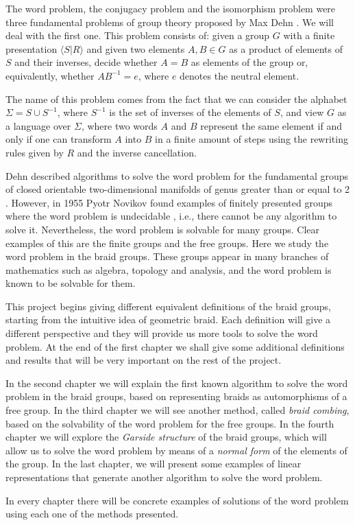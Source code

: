 \documentclass[TFG.tex]{subfiles}
\begin{document}

The word problem, the conjugacy problem and the isomorphism problem were three fundamental problems of group theory proposed by Max Dehn \cite{Dehn11}. We will deal with the first one. This problem consists of: given a group $G$ with a finite presentation $\langle S|R\rangle$ and given two elements $A,B\in G$ as a product of elements of $S$ and their inverses, decide whether $A=B$ as elements of the group or, equivalently, whether $AB^{-1}=e$, where $e$ denotes the neutral element. 

The name of this problem comes from the fact that we can consider the alphabet $\Sigma=S\cup S^{-1}$, where $S^{-1}$ is the set of inverses of the elements of $S$, and view $G$ as a language over $\Sigma$, where two words $A$ and $B$ represent the same element if and only if one can transform $A$ into $B$ in a finite amount of steps using the rewriting rules given by $R$ and the inverse cancellation. 

Dehn described algorithms to solve the word problem for the fundamental groups of closed orientable two-dimensional manifolds of genus greater than or equal to 2 \cite{Dehn12}. However, in 1955 Pyotr Novikov found examples of finitely presented groups where the word problem is undecidable \cite{Novikov}, i.e., there cannot be any algorithm to solve it. Nevertheless, the word problem is solvable for many groups. Clear examples of this are the finite groups and the free groups. Here we study the word problem in the braid groups. These groups appear in many branches of mathematics such as algebra, topology and analysis, and the word problem is known to be solvable for them.  

This project begins giving different equivalent definitions of the braid groups, starting from the intuitive idea of geometric braid. Each definition will give a different perspective and they will provide us more tools to solve the word problem. At the end of the first chapter we shall give some additional definitions and results that will be very important on the rest of the project.

In the second chapter we will explain the first known algorithm to solve the word problem in the braid groups, based on representing braids as automorphisms of a free group. In the third chapter we will see another method, called \emph{braid combing}, based on the solvability of the word problem for the free groups. In the fourth chapter we will explore the \emph{Garside structure} of the braid groups, which will allow us to solve the word problem by means of a \emph{normal form} of the elements of the group. In the last chapter, we will present some examples of linear representations that generate another algorithm to solve the word problem. 

In every chapter there will be concrete examples of solutions of the word problem using each one of the methods presented.
\end{document}
